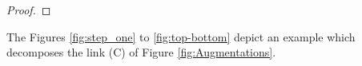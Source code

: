 \documentclass[11pt]{amsart}
\newcommand{\figref}[1]{Figure \ref{#1}}
\newcommand{\torus}{{\mathbb{T}^2}}
\theoremstyle{plain}
\theoremstyle{definition}
\begin{document}
\begin{proof}
\end{proof}




The Figures \ref{fig:step_one} to \ref{fig:top-bottom}
depict an example which decomposes the link (C) of
\figref{fig:Augmentations}. 
\end{document}
